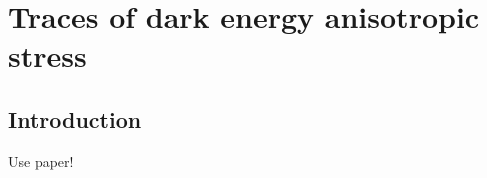 \chapter{Traces of dark energy anisotropic stress}
\label{chapter:6}

\section{Introduction}

Use paper!